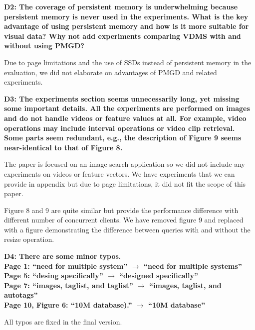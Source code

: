 \documentclass[11pt]{proposalnsf}
\begin{document}
\bigskip
\noindent %
\textbf{
D2: The coverage of persistent memory is underwhelming because persistent memory
is never used in the experiments.
What is the key advantage of using persistent memory and how is it
more suitable for visual data? Why not add experiments comparing VDMS with
and without using PMGD?
}\bigskip

Due to page limitations and the use of SSDs instead of persistent memory in the
evaluation, we did not elaborate on advantages of PMGD and related experiments.

\bigskip
\noindent %
\textbf{
D3: The experiments section seems unnecessarily long, yet missing some important
details. All the experiments are performed on images and do not handle videos or feature
values at all. For example, video operations may include interval operations or video
clip retrieval. Some parts seem redundant, e.g., the description of Figure 9 seems
near-identical to that of Figure 8.
}\bigskip

The paper is focused on an image search application so we did not include any
experiments on videos or feature vectors. We have experiments that we can provide in
appendix but due to page limitations, it did not fit the scope of this paper.

Figure 8 and 9 are quite similar but provide the performance difference with different
number of concurrent clients. We have removed figure 9 and replaced with a figure
demonstrating the difference between queries with and without the resize operation.

\bigskip
\noindent %
\textbf{
D4: There are some minor typos.\\
Page 1: “need for multiple system” $\rightarrow$  “need for multiple systems”\\
Page 5: “desing specifically” $\rightarrow$ “designed specifically”\\
Page 7: “images, taglist, and taglist” $\rightarrow$ “images, taglist, and autotags”\\
Page 10, Figure 6: “10M database).” $\rightarrow$ “10M database”
}\bigskip

All typos are fixed in the final version.

\end{document}
